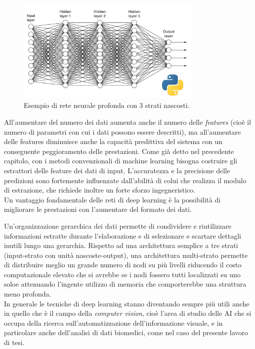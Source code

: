     \begin{figure}[H]
      \centering
      \includegraphics[width=0.8\textwidth]{Figures/deep-neural-network.jpg}
      \caption{\small{Esempio di rete neurale profonda con 3 strati nascosti.~\cite{dnn}} %
      } %
      \label{fi:dcalc}
    \end{figure}
    
       All’aumentare del numero dei dati aumenta anche il numero delle \emph{features} (cioè il numero di parametri con cui i dati possono essere descritti),
        ma
        all’aumentare delle features diminuisce anche la capacità predittiva del
       sistema con un conseguente peggioramento delle prestazioni.
       Come già detto nel precedente capitolo, con i metodi convenzionali di machine learning
       bisogna costruire gli estrattori delle feature dei dati di input. L’accuratezza e la precisione
       delle predizioni sono fortemente influenzate dall’abilità di colui che realizza il modulo di
       estrazione, che richiede inoltre un forte sforzo ingegneristico.\\
       Un vantaggio fondamentale delle reti di deep learning è la possibilità di migliorare le prestazioni 
       con l’aumentare del formato dei dati.

Un’organizzazione gerarchica dei dati permette di condividere e riutilizzare informazioni
 estratte durante l’elaborazione e di selezionare e scartare dettagli inutili lungo una gerarchia.
  Rispetto ad una architettura semplice a tre strati (input-strato con unità nascoste-output),
   una architettura multi-strato permette di distribuire meglio un grande numero di nodi 
   su più livelli riducendo il costo computazionale elevato che si avrebbe se i nodi fossero
    tutti localizzati
    su uno soloe attenuando l’ingente utilizzo di memoria che comporterebbe una 
    struttura meno profonda. \\ 
    In generale le tecniche di deep learning stanno diventando sempre più utili anche in quello
     che è il campo della \emph{computer vision}, 
    cioè l'area di studio delle AI che si occupa della ricerca sull'automatizzazione 
    dell'informazione visuale, e in particolare anche dell'analisi di dati biomedici,
     come nel caso del presente lavoro di tesi.\\
    
